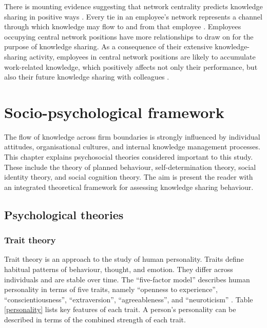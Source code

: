 There is mounting evidence suggesting that network centrality predicts knowledge sharing in positive ways \citep[e.g.][]{freeman1979centrality,burt1992structural,tsai2001knowledge}. Every tie in an employee’s network represents a channel through which knowledge may flow to and from that employee \citep{anderson2008social}. Employees occupying central network positions have more relationships to draw on for the purpose of knowledge sharing. As a consequence of their extensive knowledge-sharing activity, employees in central network positions are likely to accumulate work-related knowledge, which positively affects not only their performance, but also their future knowledge sharing with colleagues \citep{sparrowe2001social}.

\section{Socio-psychological framework}

The flow of knowledge across firm boundaries is strongly influenced by individual attitudes, organisational cultures, and internal knowledge management processes. This chapter explains psychosocial theories considered important to this study. These include the theory of planned behaviour, self-determination theory, social identity theory, and social cognition theory. The aim is present the reader with an integrated theoretical framework for assessing knowledge sharing behaviour.

\subsection{Psychological theories}

\subsubsection{Trait theory}

Trait theory is an approach to the study of human personality. Traits define habitual patterns of behaviour, thought, and emotion. They differ across individuals and are stable over time. The \enquote{five-factor model} describes human personality in terms of five traits, namely \enquote{openness to experience}, \enquote{conscientiousness}, \enquote{extraversion}, \enquote{agreeableness}, and \enquote{neuroticism} \citep{mccrae1992introduction}. Table \ref{personality} lists key features of each trait. A person's personality can be described in terms of the combined strength of each trait. \medskip 

